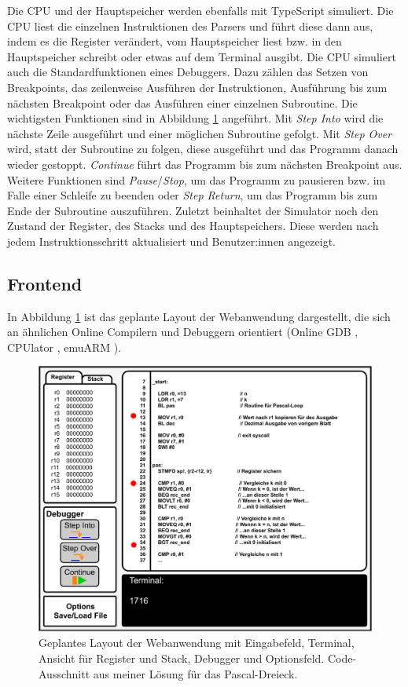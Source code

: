 \documentclass[a4paper, 11pt, onecolumn]{article}
\begin{document}
Die CPU und der Hauptspeicher werden ebenfalls mit TypeScript simuliert. Die CPU liest die einzelnen Instruktionen des Parsers und führt diese dann aus, indem es die Register verändert, vom Hauptspeicher liest bzw. in den Hauptspeicher schreibt oder etwas auf dem Terminal ausgibt. Die CPU simuliert auch die Standardfunktionen eines Debuggers. Dazu zählen das Setzen von Breakpoints, das zeilenweise Ausführen der Instruktionen, Ausführung bis zum nächsten Breakpoint oder das Ausführen einer einzelnen Subroutine. Die wichtigsten Funktionen sind in Abbildung \ref{layout} angeführt. Mit \textit{Step Into} wird die nächste Zeile ausgeführt und einer möglichen Subroutine gefolgt. Mit \textit{Step Over} wird, statt der Subroutine zu folgen, diese ausgeführt und das Programm danach wieder gestoppt. \textit{Continue} führt das Programm bis zum nächsten Breakpoint aus. Weitere Funktionen sind \textit{Pause}/\textit{Stop}, um das Programm zu pausieren bzw. im Falle einer Schleife zu beenden oder \textit{Step Return}, um das Programm bis zum Ende der Subroutine auszuführen. Zuletzt beinhaltet der Simulator noch den Zustand der Register, des Stacks und des Hauptspeichers. Diese werden nach jedem Instruktionsschritt aktualisiert und Benutzer:innen angezeigt.

\subsection{Frontend}

In Abbildung \ref{layout} ist das geplante Layout der Webanwendung dargestellt, die sich an ähnlichen Online Compilern und Debuggern orientiert (Online GDB \cite{onlinegdb}, CPUlator \cite{cpulator}, emuARM \cite{emuarm}).

\begin{figure}[!htb]	
	\includegraphics[width=0.8\paperwidth]{data/layout}
	\caption{Geplantes Layout der Webanwendung mit Eingabefeld, Terminal, Ansicht für Register und Stack, Debugger und Optionsfeld. Code-Ausschnitt aus meiner Lösung für das Pascal-Dreieck.}
	\label{layout}
\end{figure}
\end{document}
